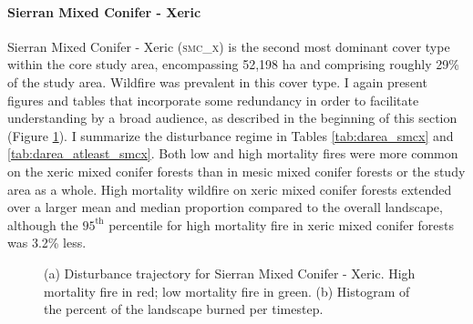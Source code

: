 

\paragraph{Sierran Mixed Conifer - Xeric}
Sierran Mixed Conifer - Xeric (\textsc{smc\_x}) is the second most dominant cover type within the core study area, encompassing 52,198 ha and comprising roughly 29\% of the study area. Wildfire was prevalent in this cover type. I again present figures and tables that incorporate some redundancy in order to facilitate understanding by a broad audience, as described in the beginning of this section (Figure \ref{fig:darea_smcx}). I summarize the disturbance regime in Tables \ref{tab:darea_smcx} and \ref{tab:darea_atleast_smcx}. Both low and high mortality fires were more common on the xeric mixed conifer forests than in mesic mixed conifer forests or the study area as a whole. High mortality wildfire on xeric mixed conifer forests extended over a larger mean and median proportion compared to the overall landscape, although the $95^{\text{th}}$ percentile for high mortality fire in xeric mixed conifer forests was 3.2\% less.

\begin{figure}[!hbp]
  \centering
  \caption{\small (a) Disturbance trajectory for Sierran Mixed Conifer - Xeric. High mortality fire in red; low mortality fire in green. (b) Histogram of the percent of the landscape burned per timestep.} 
  \label{fig:darea_smcx}
\end{figure}

